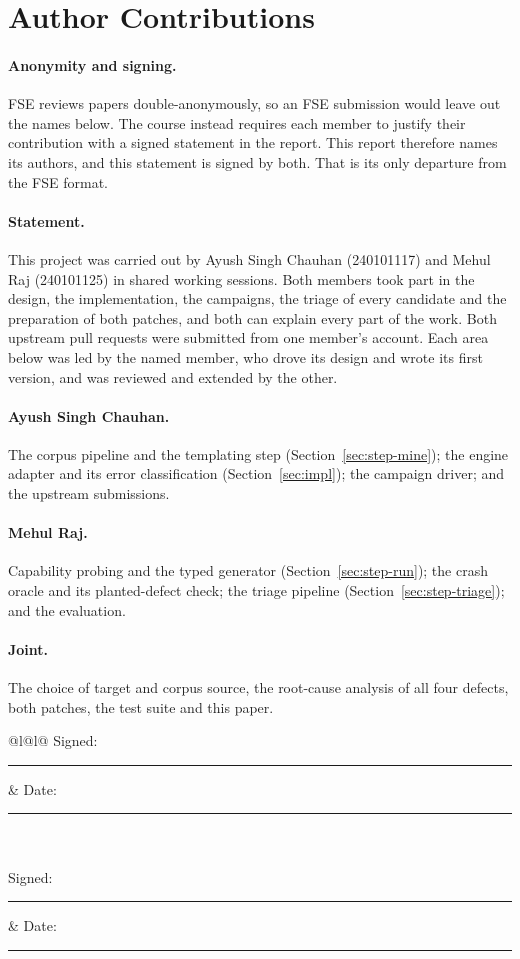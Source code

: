 \section*{Author Contributions}
\label{sec:contributions}

\paragraph{Anonymity and signing.} FSE reviews papers double-anonymously, so an
FSE submission would leave out the names below. The course instead requires each
member to justify their contribution with a signed statement in the report.
This report therefore names its authors, and this statement is signed by both.
That is its only departure from the FSE format.

\paragraph{Statement.} This project was carried out by Ayush Singh Chauhan
(240101117) and Mehul Raj (240101125) in shared working sessions. Both members
took part in the design, the implementation, the campaigns, the triage of every
candidate and the preparation of both patches, and both can explain every part
of the work. Both upstream pull requests were submitted from one member's
account. Each area below was led by the named member, who drove its design and
wrote its first version, and was reviewed and extended by the other.

\paragraph{Ayush Singh Chauhan.} The corpus pipeline and the templating step
(Section~\ref{sec:step-mine}); the engine adapter and its error classification
(Section~\ref{sec:impl}); the campaign driver; and the upstream submissions.

\paragraph{Mehul Raj.} Capability probing and the typed generator
(Section~\ref{sec:step-run}); the crash oracle and its planted-defect check; the
triage pipeline (Section~\ref{sec:step-triage}); and the evaluation.

\paragraph{Joint.} The choice of target and corpus source, the root-cause
analysis of all four defects, both patches, the test suite and this paper.

\medskip\noindent
\begin{tabular}{@{}l@{\quad}l@{}}
Signed: \rule{0.42\linewidth}{0.4pt} & Date: \rule{0.18\linewidth}{0.4pt} \\
 \\[3ex]
Signed: \rule{0.42\linewidth}{0.4pt} & Date: \rule{0.18\linewidth}{0.4pt} \\
 \\
\end{tabular}
